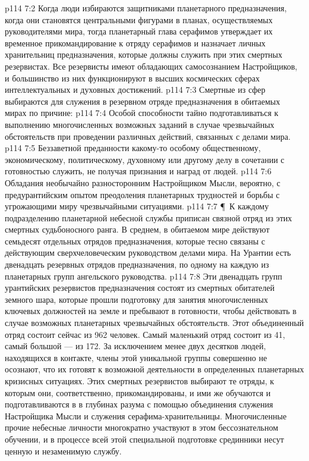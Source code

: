 \vs p114 7:2 Когда люди избираются защитниками планетарного предназначения, когда они становятся центральными фигурами в планах, осуществляемых руководителями мира, тогда планетарный глава серафимов утверждает их временное прикомандирование к отряду серафимов и назначает личных хранительниц предназначения, которые должны служить при этих смертных резервистах. Все резервисты имеют обладающих самосознанием Настройщиков, и большинство из них функционируют в высших космических сферах интеллектуальных и духовных достижений.
\vs p114 7:3 Смертные из сфер выбираются для служения в резервном отряде предназначения в обитаемых мирах по причине:
\vs p114 7:4 \bibnobreakspace Особой способности тайно подготавливаться к выполнению многочисленных возможных заданий в случае чрезвычайных обстоятельств при проведении различных действий, связанных с делами мира.
\vs p114 7:5 \bibnobreakspace Беззаветной преданности какому\hyp{}то особому общественному, экономическому, политическому, духовному или другому делу в сочетании с готовностью служить, не получая признания и наград от людей.
\vs p114 7:6 \bibnobreakspace Обладания необычайно разносторонним Настройщиком Мысли, вероятно, с предурантийским опытом преодоления планетарных трудностей и борьбы с угрожающими миру чрезвычайными ситуациями.
\vs p114 7:7 \P\ К каждому подразделению планетарной небесной службы приписан связной отряд из этих смертных судьбоносного ранга. В среднем, в обитаемом мире действуют семьдесят отдельных отрядов предназначения, которые тесно связаны с действующим сверхчеловеческим руководством делами мира. На Урантии есть двенадцать резервных отрядов предназначения, по одному на каждую из планетарных групп ангельского руководства.
\vs p114 7:8 Эти двенадцать групп урантийских резервистов предназначения состоят из смертных обитателей земного шара, которые прошли подготовку для занятия многочисленных ключевых должностей на земле и пребывают в готовности, чтобы действовать в случае возможных планетарных чрезвычайных обстоятельств. Этот объединенный отряд состоит сейчас из 962 человек. Самый маленький отряд состоит из 41, самый большой --- из 172. За исключением менее двух десятков людей, находящихся в контакте, члены этой уникальной группы совершенно не осознают, что их готовят к возможной деятельности в определенных планетарных кризисных ситуациях. Этих смертных резервистов выбирают те отряды, к которым они, соответственно, прикомандированы, и ими же обучаются и подготавливаются в в глубинах разума с помощью объединения служения Настройщика Мысли и служения серафима\hyp{}хранительницы. Многочисленные прочие небесные личности многократно участвуют в этом бессознательном обучении, и в процессе всей этой специальной подготовке срединники несут ценную и незаменимую службу.
